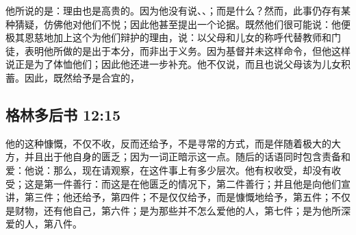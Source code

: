 \par

他所说的是：理由也是高贵的。因为他没有说、、；而是什么？然而，此事仍存有某种猜疑，仿佛他对他们不悦；因此他甚至提出一个论据。既然他们很可能说：他便极其恩慈地加上这个为他们辩护的理由，说：以父母和儿女的称呼代替教师和门徒，表明他所做的是出于本分，而非出于义务。因为基督并未这样命令，但他这样说正是为了体恤他们；因此他还进一步补充。他不仅说，而且也说父母该为儿女积蓄。因此，既然给予是合宜的，\par


\subsection{格林多后书 12:15}

\par

他的这种慷慨，不仅不收，反而还给予，不是寻常的方式，而是伴随着极大的大方，并且出于他自身的匮乏；因为一词正暗示这一点。随后的话语同时包含责备和爱：他说：那么，现在请观察，在这件事上有多少层次。他有权收受，却没有收受；这是第一件善行：而这是在他匮乏的情况下，第二件善行；并且他是向他们宣讲，第三件；他还给予，第四件；不是仅仅给予，而是慷慨地给予，第五件；不仅是财物，还有他自己，第六件；是为那些并不怎么爱他的人，第七件；是为他所深爱的人，第八件。\par

